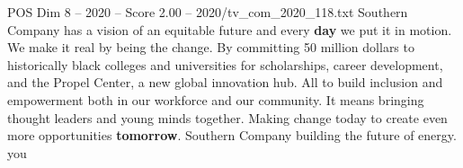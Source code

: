 \begin{textsample}{POS Dim 8 – 2020 – Score 2.00 – 2020/tv\_com\_2020\_118.txt}  \label{ex:f8_pos_024}
Southern Company has a vision of an equitable future and every \textbf{day} we put it in motion.
We make it real by being the change.
By committing 50 million dollars to historically black colleges and universities for scholarships, career development, and the Propel Center, a new global innovation hub.
All to build inclusion and empowerment both in our workforce and our community.
It means bringing thought leaders and young minds together.
Making change today to create even more opportunities \textbf{tomorrow}.
Southern Company building the future of energy. you

\end{textsample}
